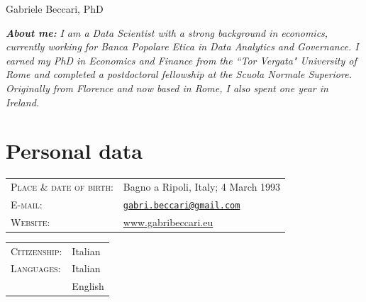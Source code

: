 \documentclass{article}
\begin{document}
\begin{center}
\par{\centering
		{\Huge Gabriele Beccari, PhD
	}\bigskip\par}
	
\end{center}

{\justify
\textbf{\emph{About me:}} \emph{I am a Data Scientist with a strong background in economics, currently working for Banca Popolare Etica in Data Analytics and Governance. I earned my PhD in Economics and Finance from the ``Tor Vergata" University of Rome and completed a postdoctoral fellowship at the Scuola Normale Superiore.\\
Originally from Florence and now based in Rome, I also spent one year in Ireland.}}

\section*{Personal data}
\begin{minipage}[l]{.64\textwidth}
\begin{tabular}{l l@{}}
	\textsc{Place \& date of birth:} & Bagno a Ripoli, Italy; 4 March 1993\\
    \textsc{E-mail:}&\texttt{\href{mailto:gabri.beccari@gmail.com}{gabri.beccari@gmail.com}}\\
    \textsc{Website:}&\href{https://www.gabribeccari.eu/}{www.gabribeccari.eu}
\end{tabular}
\end{minipage}
\begin{minipage}[r]{.34\textwidth}
\begin{tabular}{l l}
\textsc{Citizenship:} & Italian\\
\textsc{Languages:}&Italian\\&English

\end{tabular}
\end{minipage}
\end{document}
